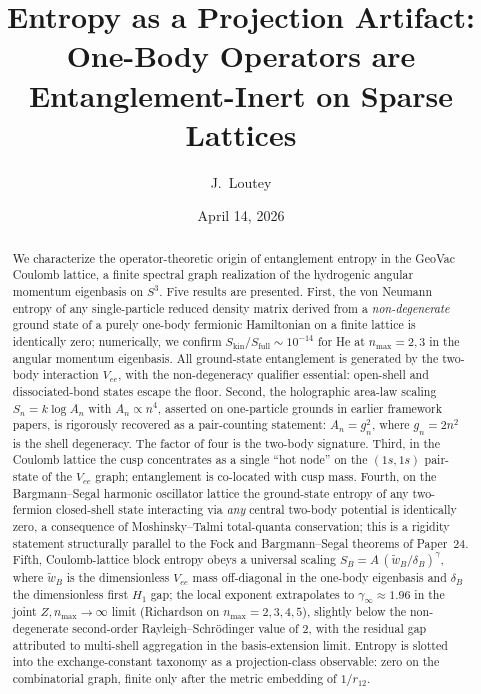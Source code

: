 \documentclass[twocolumn,pra,amsmath,amssymb,superscriptaddress]{revtex4-2}
\begin{document}
\title{Entropy as a Projection Artifact:\\
One-Body Operators are Entanglement-Inert on Sparse Lattices}

\author{J.~Loutey}

\date{April 14, 2026}

\begin{abstract}
We characterize the operator-theoretic origin of entanglement
entropy in the GeoVac Coulomb lattice, a finite spectral graph
realization of the hydrogenic angular momentum eigenbasis on
$S^{3}$.  Five results are presented.  First, the von Neumann
entropy of any single-particle reduced density matrix derived from
a \emph{non-degenerate} ground state of a purely one-body fermionic
Hamiltonian on a finite lattice is identically zero; numerically,
we confirm $S_{\mathrm{kin}}/S_{\mathrm{full}} \sim 10^{-14}$ for
He at $n_{\max}=2,3$ in the angular momentum eigenbasis.  All
ground-state entanglement is generated by the two-body interaction
$V_{ee}$, with the non-degeneracy qualifier essential: open-shell
and dissociated-bond states escape the floor.  Second, the
holographic area-law scaling $S_n = k\log A_n$ with
$A_n\propto n^{4}$, asserted on one-particle grounds in earlier
framework papers, is rigorously recovered as a pair-counting
statement: $A_n=g_n^{2}$, where $g_n=2n^{2}$ is the shell
degeneracy.  The factor of four is the two-body signature.
Third, in the Coulomb lattice the cusp concentrates as a single
``hot node'' on the $(1s,1s)$ pair-state of the $V_{ee}$ graph;
entanglement is co-located with cusp mass.  Fourth, on the
Bargmann--Segal harmonic oscillator lattice the ground-state
entropy of any two-fermion closed-shell state interacting via
\emph{any} central two-body potential is identically zero, a
consequence of Moshinsky--Talmi total-quanta conservation; this
is a rigidity statement structurally parallel to the Fock and
Bargmann--Segal theorems of Paper~24.  Fifth, Coulomb-lattice
block entropy obeys a universal scaling
$S_B = A\,(\tilde{w}_B/\delta_B)^{\gamma}$, where
$\tilde{w}_B$ is the dimensionless $V_{ee}$ mass off-diagonal
in the one-body eigenbasis and $\delta_B$ the dimensionless
first $H_1$ gap; the local exponent extrapolates to
$\gamma_{\infty} \approx 1.96$ in the joint $Z, n_{\max}\to\infty$
limit (Richardson on $n_{\max}=2,3,4,5$), slightly below the
non-degenerate second-order Rayleigh--Schr\"odinger value of
$2$, with the residual gap attributed to multi-shell
aggregation in the basis-extension limit.  Entropy is slotted into the
exchange-constant taxonomy as a projection-class observable:
zero on the combinatorial graph, finite only after the metric
embedding of $1/r_{12}$.
\end{abstract}
\end{document}

